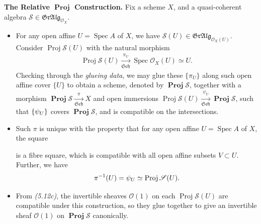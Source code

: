 \documentclass[11pt,a4paper,footinclude=true,headinclude=true]{scrbook} %
\let\Im\relax
\DeclareMathOperator{\Im}{Im}
\DeclareMathOperator{\Spec}{Spec}
\DeclareMathOperator{\Proj}{Proj}
\DeclareMathOperator{\PROJ}{\mathbf{Proj}}
\newcommand{\OO}{\mathcal{O}}
\newcommand{\Ss}{\mathscr{S}}
\newcommand{\Sch}{\mathfrak{Sch}}
\newcommand{\<}{\langle}
\newcommand{\>}{\rangle}
\newcommand{\GR}{\mathfrak{Gr}}
\newcommand{\ALG}{\mathfrak{Alg}}
\newcommand\FibSq[2][\square]{%
  \arrow[mysymbol]{#2}[description]{#1}}
\newenvironment{summary}[2][]
    { \begin{mdframed}[backgroundcolor=green!20] \textbf{#1 #2.} }
    {  \end{mdframed}}
\begin{document}
\begin{summary}{The Relative $\PROJ$ Construction}
    \newline Fix a scheme $X$, and a quasi-coherent algebra $\Ss\in\GR\ALG_{\OO_X}$.
    \begin{itemize}
        \item For any open affine $U=\Spec A$ of $X$, we have $\Ss(U)\in\GR\ALG_{\OO_X(U)}$. Consider $\Proj\Ss(U)$ with the natural morphism
        \begin{align*}
            \Proj\Ss(U)\xrightarrow[\Sch]{\pi_U}\Spec\OO_X(U)\simeq U.
        \end{align*}
        Checking through the \textit{glueing data}, we may glue these $\{\pi_U\}$ along such open affine cover $\{U\}$ to obtain a scheme, denoted by $\PROJ\Ss$, together with a morphism $\PROJ\Ss\xrightarrow[\Sch]{\pi}X$ and open immersions $\Proj\Ss(U)\xrightarrow[\Sch]{\psi_U}\PROJ\Ss$, such that $\{\Im\psi_U\}$ covers $\PROJ\Ss$, and is compatible on the intersections.
        \item Such $\pi$ is unique with the property that for any open affine $U=\Spec A$ of $X$, the square
        \begin{center}
        \end{center}
        is a fibre square, which is compatible with all open affine subsets $V\subset U$. Further, we have
        \begin{align*}
            \pi^{-1}(U)=\Im\psi_U\simeq\Proj\Ss(U).
        \end{align*}
        \item From \textit{(5.12c)}, the invertible sheaves $\OO(1)$ on each $\Proj\Ss(U)$ are compatible under this construction, so they glue together to give an invertible sheaf $\OO(1)$ on $\PROJ\Ss$ canonically.
    \end{itemize}
\end{summary}
\end{document}
